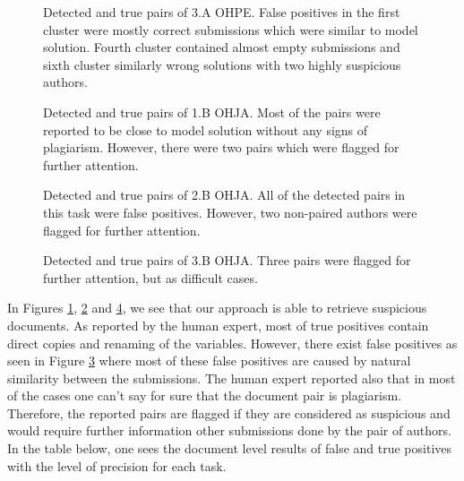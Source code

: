 \newpage


\begin{figure}[ht] 
    \setlength\figureheight{7cm}
    \setlength\figurewidth{\textwidth}
    
    \caption{Detected and true pairs of 3.A OHPE. False positives in the first cluster were mostly correct submissions which were similar to model solution. Fourth cluster contained almost empty submissions and sixth cluster similarly wrong solutions with two highly suspicious authors.}
    \label{fig-plgdet-res3a}
\end{figure}

\begin{figure}[!h] 
    \setlength\figureheight{6cm}
    \setlength\figurewidth{\textwidth}
    
    \caption{Detected and true pairs of 1.B OHJA. Most of the pairs were reported to be close to model solution without any signs of plagiarism. However, there were two pairs which were flagged for further attention.}
     \label{fig-plgdet-res1b}
\end{figure}

\newpage

\begin{figure}[ht] 
    \setlength\figureheight{6cm}
    \setlength\figurewidth{\textwidth}
    
    \caption{Detected and true pairs of 2.B OHJA. All of the detected pairs in this task were false positives. However, two non-paired authors were flagged for further attention.}
    \label{fig-plgdet-res2b}
\end{figure}

\begin{figure}[!h] 
    \setlength\figureheight{6cm}
    \setlength\figurewidth{\textwidth}
    
    \caption{Detected and true pairs of 3.B OHJA. Three pairs were flagged for further attention, but as difficult cases.}
    \label{fig-plgdet-res3b}
\end{figure}

\noindent
In Figures \ref{fig-plgdet-res3a}, \ref{fig-plgdet-res1b} and \ref{fig-plgdet-res3b}, we see that our approach is able to retrieve suspicious documents. As reported by the human expert, most of true positives contain direct copies and renaming of the variables. However, there exist false positives as seen in Figure \ref{fig-plgdet-res2b} where most of these false positives are caused by natural similarity between the submissions. The human expert reported also that in most of the cases one can't say for sure that the document pair is plagiarism. Therefore, the reported pairs are flagged if they are considered as suspicious and would require further information \eg other submissions done by the pair of authors. In the table below, one sees the document level results of false and true positives with the level of precision for each task.

